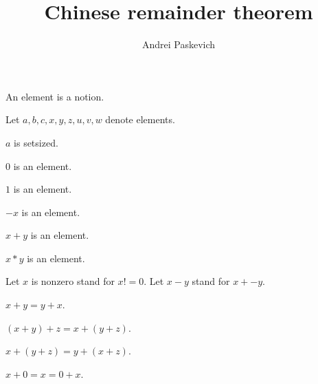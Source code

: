 \documentclass{document}
\title{Chinese remainder theorem}
\author{Andrei Paskevich}
\date{}
\begin{document}

  \maketitle

  \begin{forthel}

    \begin{signature}[ElmSort]
      An element is a notion.
    \end{signature}

    Let $a,b,c,x,y,z,u,v,w$ denote elements.
    
    \begin{axiom}
      $a$ is setsized.
    \end{axiom}

    \begin{signature}[SortsC]
      $0$ is an element.
    \end{signature}

    \begin{signature}[SortsC]
      $1$ is an element.
    \end{signature}

    \begin{signature}[Sortsu]
      $-x$ is an element.
    \end{signature}

    \begin{signature}[SortsB]
      $x + y$ is an element.
    \end{signature}

    \begin{signature}[SortsB]
      $x * y$ is an element.
    \end{signature}

    Let $x$ is nonzero stand for $x != 0$.
    Let $x - y$ stand for $x + -y$.

    \begin{axiom}[AddComm]
      $x + y = y + x$.
    \end{axiom}

    \begin{axiom}[AddAsso]
      $(x + y) + z = x + (y + z)$.
    \end{axiom}

    \begin{axiom}[AddBubble]
      $x + (y + z) = y + (x + z)$.
    \end{axiom}

    \begin{axiom}[AddZero]
      $x + 0 = x = 0 + x$.
    \end{axiom}


\end{forthel}
\end{document}
